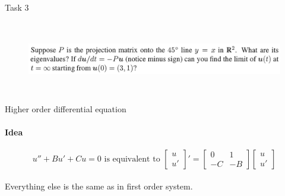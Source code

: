 \documentclass[aspectratio=169]{beamer}
\newcommand{\fbckg}[1]{\usebackgroundtemplate{\texttt{[image: \#1]}}}%
\begin{document}
\begin{frame}[t]{Task 3}
    \framesubtitle{}
    \vspace{-0.5cm}
    \begin{figure}[H]
        \centering\includegraphics[height=3cm,width=1\textwidth,keepaspectratio]{3.png}
        \label{fig:3.png}
    \end{figure}
\end{frame}

\begin{frame}[t]{Higher order differential equation}
\framesubtitle{Idea}
\Large
$$ u'' + Bu' + Cu = 0 \text{ is equivalent to } \begin{bmatrix}
u\\
u'
\end{bmatrix}' = \begin{bmatrix}
0 & 1\\ 
-C & -B 
\end{bmatrix} \begin{bmatrix}
u\\
u'
\end{bmatrix}$$
\\
Everything else is the same as in first order system.
\end{frame}

\usebackgroundtemplate{}

\fbckg{fibeamer/figs/common.png}
\end{document}

